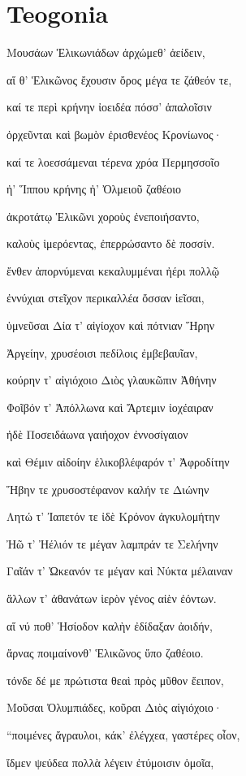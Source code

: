 \part{Teogonia}


\begin{pages}
    \begin{Leftside}
        \beginnumbering
            \pstart
				\Porson
Μουσάων Ἑλικωνιάδων ἀρχώμεθ' ἀείδειν,

αἵ θ' Ἑλικῶνος ἔχουσιν ὄρος μέγα τε ζάθεόν τε, 

καί τε περὶ κρήνην ἰοειδέα πόσσ' ἁπαλοῖσιν

ὀρχεῦνται καὶ βωμὸν ἐρισθενέος Κρονίωνος·

καί τε λοεσσάμεναι τέρενα χρόα Περμησσοῖο 

ἠ' Ἵππου κρήνης ἠ' Ὀλμειοῦ ζαθέοιο

ἀκροτάτῳ Ἑλικῶνι χοροὺς ἐνεποιήσαντο,

καλοὺς ἱμερόεντας, ἐπερρώσαντο δὲ ποσσίν.

ἔνθεν ἀπορνύμεναι κεκαλυμμέναι ἠέρι πολλῷ 

ἐννύχιαι στεῖχον περικαλλέα ὄσσαν ἱεῖσαι, 

ὑμνεῦσαι Δία τ' αἰγίοχον καὶ πότνιαν Ἥρην

Ἀργείην, χρυσέοισι πεδίλοις ἐμβεβαυῖαν, 

κούρην τ' αἰγιόχοιο Διὸς γλαυκῶπιν Ἀθήνην

Φοῖβόν τ' Ἀπόλλωνα καὶ Ἄρτεμιν ἰοχέαιραν

ἠδὲ Ποσειδάωνα γαιήοχον ἐννοσίγαιον  

καὶ Θέμιν αἰδοίην ἑλικοβλέφαρόν τ' Ἀφροδίτην

Ἥβην τε χρυσοστέφανον καλήν τε Διώνην

Λητώ τ' Ἰαπετόν τε ἰδὲ Κρόνον ἀγκυλομήτην

Ἠῶ τ' Ἠέλιόν τε μέγαν λαμπράν τε Σελήνην

Γαῖάν τ' Ὠκεανόν τε μέγαν καὶ Νύκτα μέλαιναν 

ἄλλων τ' ἀθανάτων ἱερὸν γένος αἰὲν ἐόντων.

αἵ νύ ποθ' Ἡσίοδον καλὴν ἐδίδαξαν ἀοιδήν,

ἄρνας ποιμαίνονθ' Ἑλικῶνος ὕπο ζαθέοιο.

τόνδε δέ με πρώτιστα θεαὶ πρὸς μῦθον ἔειπον,

Μοῦσαι Ὀλυμπιάδες, κοῦραι Διὸς αἰγιόχοιο·  

``ποιμένες ἄγραυλοι, κάκ' ἐλέγχεα, γαστέρες οἶον,

ἴδμεν ψεύδεα πολλὰ λέγειν ἐτύμοισιν ὁμοῖα,


\end{Leftside}
\end{pages}
